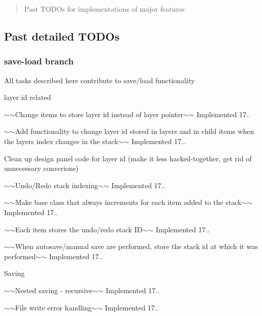 \begin{quote}
Past T\+O\+D\+Os for implementations of major features \end{quote}
\subsection*{Past detailed T\+O\+D\+Os}

\subsubsection*{save-\/load branch}

All tasks described here contribute to save/load functionality
\begin{DoxyItemize}
\item layer id related
\begin{DoxyItemize}
\item $\sim$$\sim$\+Change items to store layer id instead of layer pointer$\sim$$\sim$ Implemented 17..
\item $\sim$$\sim$\+Add functionality to change layer id stored in layers and in child items when the layer\textquotesingle{}s index changes in the stack$\sim$$\sim$ Implemented 17..
\item Clean up design panel code for layer id (make it less \textquotesingle{}hacked-\/together\textquotesingle{}, get rid of unnecessary converions)
\end{DoxyItemize}
\item $\sim$$\sim$\+Undo/\+Redo stack indexing$\sim$$\sim$ Implemented 17..
\begin{DoxyItemize}
\item $\sim$$\sim$\+Make base class that always increments for each item added to the stack$\sim$$\sim$ Implemented 17..
\item $\sim$$\sim$\+Each item stores the undo/redo stack I\+D$\sim$$\sim$ Implemented 17..
\item $\sim$$\sim$\+When autosave/manual save are performed, store the stack id at which it was performed$\sim$$\sim$ Implemented 17..
\end{DoxyItemize}
\item Saving
\begin{DoxyItemize}
\item $\sim$$\sim$\+Nested saving -\/ recursive$\sim$$\sim$ Implemented 17..
\item $\sim$$\sim$\+File write error handling$\sim$$\sim$ Implemented 17..

\end{DoxyItemize}
\end{DoxyItemize}
